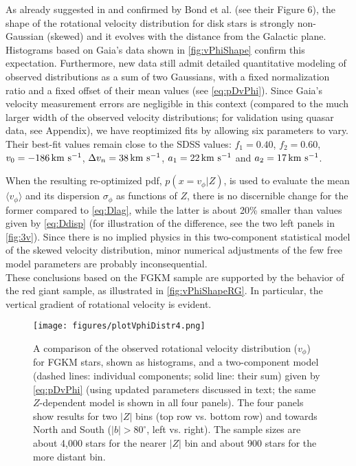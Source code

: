 As already suggested in \cite{2008ApJ...684..287I} and confirmed by Bond et al. (see their Figure 6), the shape of the rotational velocity
distribution for disk stars is strongly non-Gaussian (skewed) and it evolves with the distance from the Galactic plane. Histograms based
on Gaia's data shown in \autoref{fig:vPhiShape} confirm this expectation. Furthermore, new data still admit detailed quantitative
modeling of observed distributions as a sum of two Gaussians, with a fixed normalization ratio and a fixed offset of their mean values (see
\autoref{eq:pDvPhi}). Since Gaia's velocity measurement errors are negligible in this context (compared to the much larger width of the observed
velocity distributions; for validation using quasar data, see Appendix), we have reoptimized fits by allowing six parameters to vary. Their best-fit values remain close to the SDSS
values: $f_1=0.40$, $f_2=0.60$, $v_0 = -186 {\rm \, km~s^{-1}}$, $\Delta v_n = 38 {\rm \, km~s^{-1}}$, $a_1 = 22 {\rm \, km~s^{-1}}$ and $a_2= 17
{\rm \, km~s^{-1}}$.  

When the resulting re-optimized pdf, $p(x=v_\phi|Z)$, is used to evaluate the mean $\langle v_\phi \rangle$ and its dispersion
$\sigma_{\phi}$  as functions of $Z$, there is no discernible change for the former compared to \autoref{eq:Dlag}, while the latter is
about 20\% smaller than values given by \autoref{eq:Ddisp} (for illustration of the difference, see the two left panels in \autoref{fig:3v}).
Since there is no implied physics in this two-component statistical model of the skewed velocity distribution, minor numerical adjustments
of the few free model parameters are probably inconsequential. \\

These conclusions based on the FGKM sample are supported by the behavior of the red giant sample, as illustrated in \autoref{fig:vPhiShapeRG}. 
In particular, the vertical gradient of rotational velocity is evident. 

\begin{figure}[!ht]
\texttt{[image: figures/plotVphiDistr4.png]}
\caption{A comparison of the observed rotational velocity distribution ($v_\phi$) for FGKM stars, shown as histograms, and a two-component model (dashed
lines: individual components; solid line: their sum) given by \autoref{eq:pDvPhi} (using updated parameters discussed in text; the same
$Z$-dependent model is shown in all four panels). The four panels show results for two $|Z|$ bins (top row vs. bottom row) and towards North and South
($|b|>80^\circ$, left vs. right). The sample sizes are about 4,000 stars for the nearer $|Z|$ bin and about 900 stars for the more distant bin.} 
\label{fig:vPhiShape} 
\end{figure}


